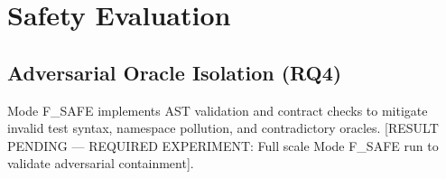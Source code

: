 \section{Safety Evaluation}
\subsection{Adversarial Oracle Isolation (RQ4)}
Mode F\_SAFE implements AST validation and contract checks to mitigate invalid test syntax, namespace pollution, and contradictory oracles.
[RESULT PENDING --- REQUIRED EXPERIMENT: Full scale Mode F\_SAFE run to validate adversarial containment].
